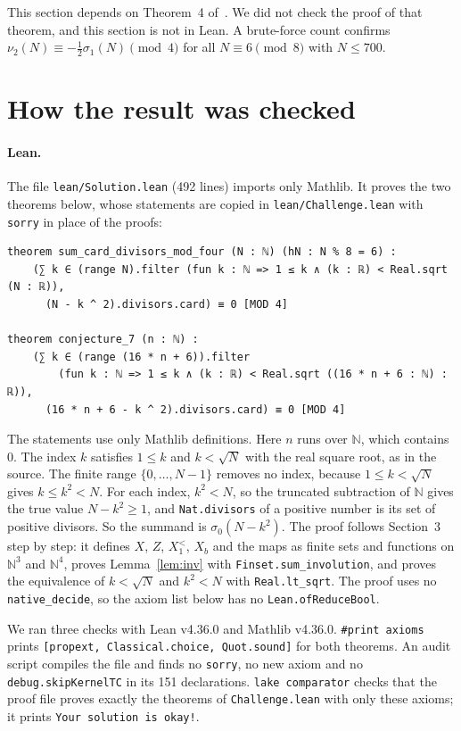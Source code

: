 \documentclass[11pt]{article}
\theoremstyle{remark}
\begin{document}
This section depends on Theorem~4 of~\cite{JKKMS}. We did not check the proof of that theorem, and this section is not in Lean. A brute-force count confirms $\nu_2(N)\equiv-\frac12\sigma_1(N)\pmod 4$ for all $N\equiv 6\pmod 8$ with $N\le 700$.

\section{How the result was checked}\label{sec:check}

\paragraph{Lean.} The file \texttt{lean/Solution.lean} (492 lines) imports only Mathlib. It proves the two theorems below, whose statements are copied in \texttt{lean/Challenge.lean} with \texttt{sorry} in place of the proofs:
\begin{Verbatim}[fontsize=\small]
theorem sum_card_divisors_mod_four (N : ℕ) (hN : N % 8 = 6) :
    (∑ k ∈ (range N).filter (fun k : ℕ => 1 ≤ k ∧ (k : ℝ) < Real.sqrt (N : ℝ)),
      (N - k ^ 2).divisors.card) ≡ 0 [MOD 4]

theorem conjecture_7 (n : ℕ) :
    (∑ k ∈ (range (16 * n + 6)).filter
        (fun k : ℕ => 1 ≤ k ∧ (k : ℝ) < Real.sqrt ((16 * n + 6 : ℕ) : ℝ)),
      (16 * n + 6 - k ^ 2).divisors.card) ≡ 0 [MOD 4]
\end{Verbatim}
The statements use only Mathlib definitions. Here $n$ runs over $\mathbb N$, which contains $0$. The index $k$ satisfies $1\le k$ and $k<\sqrt N$ with the real square root, as in the source. The finite range $\{0,\dots,N-1\}$ removes no index, because $1\le k<\sqrt N$ gives $k\le k^2<N$. For each index, $k^2<N$, so the truncated subtraction of $\mathbb N$ gives the true value $N-k^2\ge 1$, and \texttt{Nat.divisors} of a positive number is its set of positive divisors. So the summand is $\sigma_0(N-k^2)$. The proof follows Section~3 step by step: it defines $X$, $Z$, $X_1^<$, $X_b$ and the maps as finite sets and functions on $\mathbb N^3$ and $\mathbb N^4$, proves Lemma~\ref{lem:inv} with \texttt{Finset.sum\_involution}, and proves the equivalence of $k<\sqrt N$ and $k^2<N$ with \texttt{Real.lt\_sqrt}. The proof uses no \texttt{native\_decide}, so the axiom list below has no \texttt{Lean.ofReduceBool}.

We ran three checks with Lean v4.36.0 and Mathlib v4.36.0. \texttt{\#print axioms} prints \texttt{[propext, Classical.choice, Quot.sound]} for both theorems. An audit script compiles the file and finds no \texttt{sorry}, no new axiom and no \texttt{debug.skipKernelTC} in its 151 declarations. \texttt{lake comparator} checks that the proof file proves exactly the theorems of \texttt{Challenge.lean} with only these axioms; it prints \texttt{Your solution is okay!}.
\end{document}
